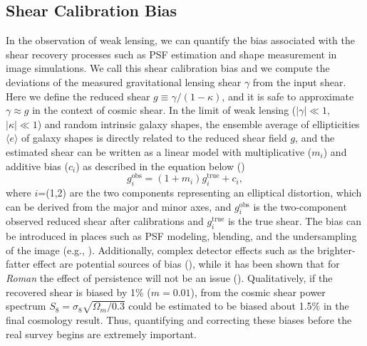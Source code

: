\documentclass[fleqn,usenatbib]{mnras}
\begin{document}
\subsection{Shear Calibration Bias}
In the observation of weak lensing, we can quantify the bias associated with the shear recovery processes such as PSF estimation and shape measurement in image simulations. We call this shear calibration bias and we compute the deviations of the measured gravitational lensing shear $\gamma$ from the input shear. Here we define the reduced shear $g \equiv \gamma/(1-\kappa)$, and it is safe to approximate $\gamma \approx g$ in the context of cosmic shear. In the limit of weak lensing ($\lvert\gamma\rvert\ll1$, $\lvert\kappa\rvert\ll1$) and random intrinsic galaxy shapes, the ensemble average of ellipticities $\langle e \rangle$ of galaxy shapes is directly related to the reduced shear field $g$, and the estimated shear can be written as a linear model with multiplicative ($m_{i}$) and additive bias ($c_{i}$) as described in the equation below (\citealt{2006MNRAS.368.1323H, 2006MNRAS.366..101H, 2007MNRAS.376...13M}) 
\begin{equation}
    g^{\textrm{obs}}_{i} = (1+m_{i})g^{\textrm{true}}_{i} + c_{i}, 
    \label{eqn:linear}
\end{equation}
where $i$=(1,2) are the two components representing an elliptical distortion, which can be derived from the major and minor axes, and $g^{\textrm{obs}}_{i}$ is the two-component observed reduced shear after calibrations and $g^{\textrm{true}}_{i}$ is the true shear. The bias can be introduced in places such as PSF modeling, blending, and the undersampling of the image (e.g., \citealt{2018ARA&A..56..393M}). Additionally, complex detector effects such as the brighter-fatter effect are potential sources of bias (\citealt{2020PASP..132a4502C}), while it has been shown that for \emph{Roman} the effect of persistence will not be an issue (\citealt{2021arXiv210610273L}). Qualitatively, if the recovered shear is biased by 1$\%$ ($m=0.01$), from the cosmic shear power spectrum $S_{8} = \sigma_{8} \sqrt{\Omega_{m}/0.3}$ could be estimated to be biased about 1.5$\%$ in the final cosmology result. Thus, quantifying and correcting these biases before the real survey begins are extremely important. 
\end{document}
